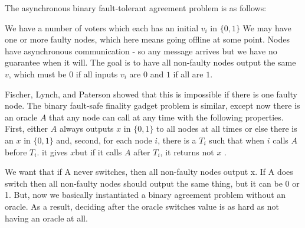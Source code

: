 \documentclass[a4paper,UKenglish,cleveref, autoref, thm-restate, anonymous]{lipics-v2019}
\begin{document}
The asynchronous binary fault-tolerant agreement problem is as follows:

We have a number of voters which each has an initial $v_i$ in $\{0,1\}$
We may have one or more faulty nodes, which here means going offline at some point. Nodes have asynchronous communication - so any message arrives but we have no guarantee when it will.
The goal is to have all non-faulty nodes output the same $v$, which must be $0$ if all inputs $v_i$ are $0$ and $1$ if all are $1$.

Fischer, Lynch, and Paterson\cite{fischer85impossibility} showed that this is impossible if there is one faulty node.
The binary fault-safe finality gadget problem is similar, except now there is an oracle $A$ that any node can call at any time with the following properties.
First, either $A$ always outputs $x$ in $\{0,1\}$ to all nodes at all times
or else there is an $x$ in $\{0,1\}$ and, second,
for each node $i$, there is a $T_i$ such that when $i$ calls $A$ before $T_i$. it gives $x$but if it calls $A$ after $T_i$, it returns not $x$ .

We want that if A never switches, then all non-faulty nodes output x. If A does switch then all non-faulty nodes should output the same thing, but it can be 0 or 1. But, now we basically instantiated a binary agreement problem without an oracle.
As a result, deciding after the oracle switches value is as hard as not having an oracle at all.
\end{document}

